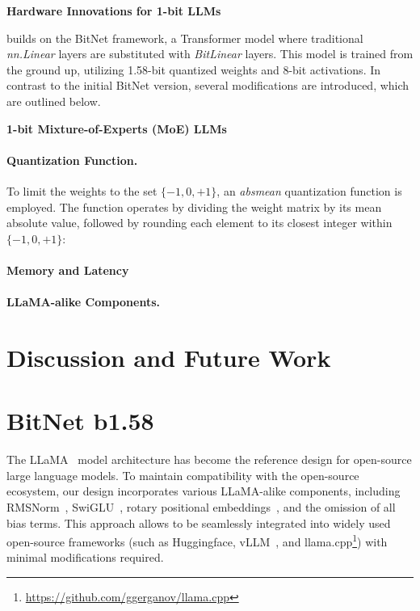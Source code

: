 \textbf{Hardware Innovations for 1-bit LLMs}

 builds on the BitNet framework, a Transformer model where traditional \emph{nn.Linear} layers are substituted with \emph{BitLinear} layers. This model is trained from the ground up, utilizing 1.58-bit quantized weights and 8-bit activations. In contrast to the initial BitNet version, several modifications are introduced, which are outlined below.

\textbf{1-bit Mixture-of-Experts (MoE) LLMs}

\paragraph{Quantization Function.} To limit the weights to the set $\{-1, 0, +1\}$, an \emph{absmean} quantization function is employed. The function operates by dividing the weight matrix by its mean absolute value, followed by rounding each element to its closest integer within $\{-1, 0, +1\}$:

\paragraph{Memory and Latency}

\paragraph{LLaMA-alike Components.}

\section{Discussion and Future Work}

\section{BitNet b1.58}

The LLaMA~\cite{llama, llama2} model architecture has become the reference design for open-source large language models. To maintain compatibility with the open-source ecosystem, our  design incorporates various LLaMA-alike components, including RMSNorm~\cite{rmsnorm}, SwiGLU~\cite{swiglu}, rotary positional embeddings~\cite{rope}, and the omission of all bias terms. This approach allows  to be seamlessly integrated into widely used open-source frameworks (such as Huggingface, vLLM~\cite{vllm}, and llama.cpp\footnote{\url{https://github.com/ggerganov/llama.cpp}}) with minimal modifications required.

